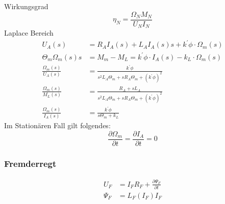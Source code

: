 Wirkungsgrad
\begin{equation}
	\eta_N = \frac{\Omega_N M_N}{U_N I_N}\label{glg:Wirkungsgrad}
\end{equation}
Laplace Bereich
\begin{align}
	U_A(s)&= R_A  I_A(s) + L_A   I_A(s)s + k^{'} \phi \cdot \Omega_m(s) \\
	\Theta_m  \Omega_m(s) s &= M_m - M_L=k^{'} \phi \cdot I_A(s) - k_L \cdot \Omega_m(s) \\
	\frac{\Omega_m(s)}{U_A(s)} &= \frac{k^{'} \phi}{s^{2} L_A \Theta_m + s R_A \Theta_m + (k^{'} \phi)^{2}}\\
	\frac{\Omega_m(s)}{M_L(s)} &= \frac{R_A + s L_A}{s^{2} L_A \Theta_m + s R_A \Theta_m + (k^{'} \phi)^{2}} \\
	\frac{\Omega_m(s)}{I_A(s)} &= \frac{k^{'} \phi}{ s  \Theta_m + k_L}
\end{align}
Im Stationären Fall gilt folgendes:
\begin{equation}
	\frac{\partial \Omega_m}{\partial t} = \frac{\partial I_A }{\partial t} = 0
\end{equation}
\subsubsection{Fremderregt}
\begin{align}
	U_F &= I_F R_F + \frac{\partial \Psi_F}{\partial t}\\
	\Psi_F &= L_F(I_F) I_F
\end{align}
